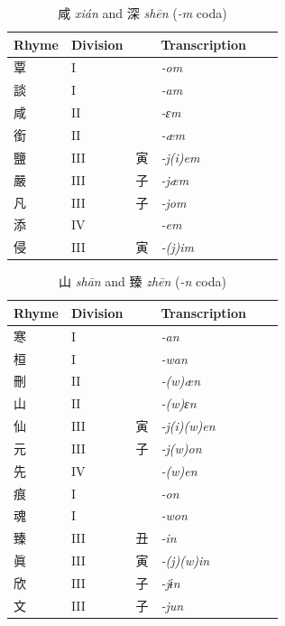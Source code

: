 \documentclass[oneside,a4paper,11pt]{article}
\newcommand{\ipa}[1]{{\phon\textit{#1}}}
\newcommand{\zh}[1]{{\cn #1}}
\newcommand{\zhc}[2]{\zh{#1} \ipa{#2}}
\begin{document}
\begin{table}[H]
\caption{\zhc{咸}{xián} and \zhc{深}{shēn} (\ipa{-m} coda)} \centering \label{tab:xian}
\begin{tabular}{llllll}
\toprule
Rhyme & Division & & Transcription \\
\midrule
\zh{覃} &	I &	 &	\ipa{-om} &	\\
\zh{談} &	I &	 &	\ipa{-am} &	\\
\zh{咸} &	II &	 &	\ipa{-ɛm} &	\\
\zh{銜} &	II &	 &	\ipa{-æm} &	\\
\zh{鹽} &	III &	\zh{寅} &	\ipa{-j(i)em} &	\\
\zh{嚴} &	III &	\zh{子} &	\ipa{-jæm} &	\\
\zh{凡} &	III &	\zh{子} &	\ipa{-jom} &	\\
\zh{添} &	IV &	 &	\ipa{-em} &	\\
\midrule
\zh{侵} &	III &	\zh{寅} &	\ipa{-(j)im} &	\\
\bottomrule
\end{tabular}
\end{table}

\begin{table}[H]
\caption{\zhc{山}{shān} and \zhc{臻}{zhēn} (\ipa{-n} coda)} \centering \label{tab:shan}
\begin{tabular}{llllll}
\toprule
Rhyme & Division & & Transcription \\
\midrule
\zh{寒} & 	I & 	& 	\ipa{-an} & 	\\
\zh{桓} & 	I & 	& 	\ipa{-wan} & 	\\
\zh{刪} & 	II & 	& 	\ipa{-(w)æn} & 	\\
\zh{山} & 	II & 	& 	\ipa{-(w)ɛn} & 	\\
\zh{仙} & 	III & 	\zh{寅} & 	\ipa{-j(i)(w)en} & 	\\
\zh{元} & 	III & 	\zh{子} & 	\ipa{-j(w)on} & 	\\
\zh{先} & 	IV & 	& 	\ipa{-(w)en} & 	\\
\midrule
\zh{痕} & 	I & 	& 	\ipa{-on} & 	\\
\zh{魂} & 	I & 	& 	\ipa{-won} & 	\\
\zh{臻} & 	III & 	\zh{丑} & 	\ipa{-in} & 	\\
\zh{眞} & 	III & 	\zh{寅} & 	\ipa{-(j)(w)in} & 	\\
\zh{欣} & 	III & 	\zh{子} & 	\ipa{-jɨn} & 	\\
\zh{文} & 	III & 	\zh{子} & 	\ipa{-jun} & 	\\
\bottomrule
\end{tabular}
\end{table}
\end{document}
